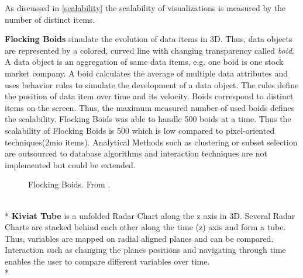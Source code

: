 As discussed in \ref{scalability} the scalability of visualizations is measured by the number of distinct items.

\textbf{Flocking Boids}  simulate the evolution of data items in 3D. Thus, data objects are represented by a colored, curved line with changing transparency called \textit{boid}.  A data object is an aggregation of same data items, e.g. one boid is one stock market company. A boid calculates the average of multiple data attributes and uses behavior rules to simulate the development of a data object. The rules define the position of data item over time and its velocity. Boids correspond to distinct items on the screen. Thus, the maximum measured number of used boids defines the scalability. Flocking Boids was able to handle 500 boids at a time. Thus the scalability of Flocking Boids is 500 which is low compared to pixel-oriented techniques(2mio items)\cite{Moere2004}. 
Analytical Methods such as clustering or subset selection are outsourced to database algorithms and interaction techniques are not implemented but could be extended\cite{Moere2004}.
\begin{figure}[H]
    \centering
    \caption{Flocking Boids. From \cite{Aigner2011}.}
    \label{fig:flockingboids}
\end{figure}
\\*
\textbf{Kiviat Tube} is a unfolded Radar Chart along the z axis in 3D. Several Radar Charts are stacked behind each other along the time (z) axis and form a tube. Thus, variables are mapped on radial aligned planes and can be compared. Interaction such as changing the planes positions and navigating through time enables the user to compare different variables over time.\\*
